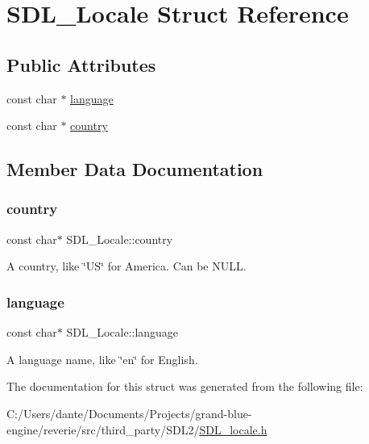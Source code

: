 \hypertarget{struct_s_d_l___locale}{}\section{S\+D\+L\+\_\+\+Locale Struct Reference}
\label{struct_s_d_l___locale}
\subsection*{Public Attributes}
\begin{DoxyCompactItemize}
\item 
const char $\ast$ \mbox{\hyperlink{struct_s_d_l___locale_a0b568d515a6587876f41fc8e059514c6}{language}}
\item 
const char $\ast$ \mbox{\hyperlink{struct_s_d_l___locale_a0a6d2720db6bc77bfa82528294c1c6e8}{country}}
\end{DoxyCompactItemize}


\subsection{Member Data Documentation}
\mbox{\label{struct_s_d_l___locale_a0a6d2720db6bc77bfa82528294c1c6e8}} 
\subsubsection{\texorpdfstring{country}{country}}
{\footnotesize\ttfamily const char$\ast$ S\+D\+L\+\_\+\+Locale\+::country}

A country, like \char`\"{}\+U\+S\char`\"{} for America. Can be N\+U\+LL. \mbox{\label{struct_s_d_l___locale_a0b568d515a6587876f41fc8e059514c6}} 
\subsubsection{\texorpdfstring{language}{language}}
{\footnotesize\ttfamily const char$\ast$ S\+D\+L\+\_\+\+Locale\+::language}

A language name, like \char`\"{}en\char`\"{} for English. 

The documentation for this struct was generated from the following file\+:\begin{DoxyCompactItemize}
\item 
C\+:/\+Users/dante/\+Documents/\+Projects/grand-\/blue-\/engine/reverie/src/third\+\_\+party/\+S\+D\+L2/\mbox{\hyperlink{_s_d_l__locale_8h}{S\+D\+L\+\_\+locale.\+h}}\end{DoxyCompactItemize}
